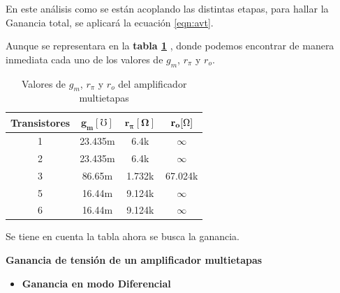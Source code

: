 \begin{enumerate}
        En este análisis como se están acoplando las distintas etapas, para hallar la Ganancia total, se aplicará la ecuación \ref{eqn:avt}.

        Aunque se representara en la \textbf{tabla \ref{tab:gm_rpi} }
        , donde podemos encontrar de manera inmediata cada uno de los valores de $g_{m}$, $r_\pi$ y $r_o$.

        \begin{table}[H]
          \centering
          \begin{tabular}{|c|c|c|c|}
            \hline
            \textbf{Transistores} & $\mathbf{g_m [\si{\mho}]}$ & $\mathbf{r_\pi [\si{\ohm}]}$ & $\mathbf{r_o [\ohm]}$ \\
            \hline
            1                     & 23.435m                    & 6.4k                         & $\infty$              \\\hline
            2                     & 23.435m                    & 6.4k                         & $\infty$              \\\hline
            3                     & 86.65m                     & 1.732k                       & 67.024k               \\\hline
            5                     & 16.44m                     & 9.124k                       & $\infty$              \\\hline
            6                     & 16.44m                     & 9.124k                       & $\infty$              \\
            \hline
          \end{tabular}
          \caption{Valores de $g_{m}$, $r_\pi$ y $r_o$ del amplificador multietapas}
          \label{tab:gm_rpi}
        \end{table}

        Se tiene en cuenta la tabla ahora se busca la ganancia.

        \textbf{Ganancia de tensión de un amplificador multietapas}

        \begin{itemize}
          \item \textbf{Ganancia en modo Diferencial}


\end{itemize}
\end{enumerate}
